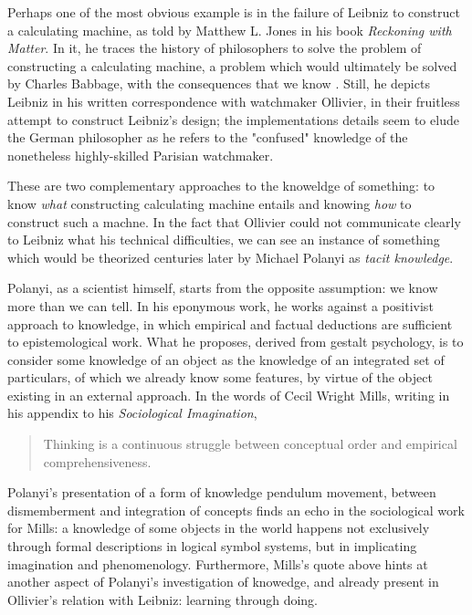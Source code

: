 Perhaps one of the most obvious example is in the failure of Leibniz to construct a calculating machine, as told by Matthew L. Jones in his book \emph{Reckoning with Matter}. In it, he traces the history of philosophers to solve the problem of constructing a calculating machine, a problem which would ultimately be solved by Charles Babbage, with the consequences that we know \citep{jones_reckoning_2016}. Still, he depicts Leibniz in his written correspondence with watchmaker Ollivier, in their fruitless attempt to construct Leibniz's design; the implementations details seem to elude the German philosopher as he refers to the "confused" knowledge of the nonetheless highly-skilled Parisian watchmaker.

These are two complementary approaches to the knoweldge of something: to know \emph{what} constructing calculating machine entails and knowing \emph{how} to construct such a machne. In the fact that Ollivier could not communicate clearly to Leibniz what his technical difficulties, we can see an instance of something which would be theorized centuries later by Michael Polanyi as \emph{tacit knowledge}.

Polanyi, as a scientist himself, starts from the opposite assumption: we know more than we can tell. In his eponymous work, he works against a positivist approach to knowledge, in which empirical and factual deductions are sufficient to epistemological work. What he proposes, derived from gestalt psychology, is to consider some knowledge of an object as the knowledge of an integrated set of particulars, of which we already know some features, by virtue of the object existing in an external approach. In the words of Cecil Wright Mills, writing in his appendix to his \emph{Sociological Imagination},

\begin{quote}
    Thinking is a continuous struggle between conceptual order and empirical comprehensiveness. \citep{MillsC.WrightCharlesWright2000Tsi}
\end{quote}

Polanyi's presentation of a form of knowledge pendulum movement, between dismemberment and integration of concepts finds an echo in the sociological work for Mills: a knowledge of some objects in the world happens not exclusively through formal descriptions in logical symbol systems, but in implicating imagination and phenomenology. Furthermore, Mills's quote above hints at another aspect of Polanyi's investigation of knowedge, and already present in Ollivier's relation with Leibniz: learning through doing.

